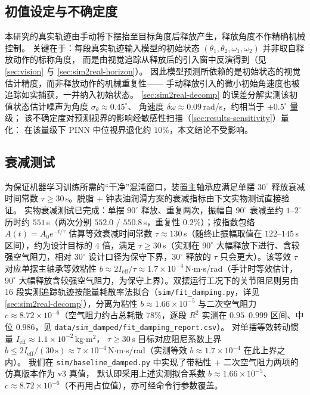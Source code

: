 \documentclass[a4paper,12pt]{ctexart}   %
\newcommand{\thetaone}{\theta_1}
\newcommand{\thetatwo}{\theta_2}
\renewcommand{\emph}[1]{#1}
\begin{document}
\subsection{初值设定与不确定度}
本研究的真实轨迹由手动将下摆抬至目标角度后释放产生，释放角度不作精确机械控制。
关键在于：每段真实轨迹输入模型的初始状态 $(\thetaone, \thetatwo, \omega_1, \omega_2)$ 并非取自释放动作的标称角度，
而是由视觉追踪从释放后的引入窗中反演得到（见 \cref{sec:vision} 与 \cref{sec:sim2real-horizon}）。
因此模型预测所依赖的是\emph{初始状态的视觉估计精度}，而非释放动作的机械重复性——
手动释放引入的微小初始角速度也被追踪如实捕获，一并纳入初始状态。
\cref{sec:sim2real-decomp} 的误差分解实测该初值状态估计噪声为角度 $\sigma_\theta \approx 0.45^\circ$、
角速度 $\delta\omega \approx 0.09$\,rad/s，约相当于 $\pm 0.5^\circ$ 量级；
该不确定度对预测视界的影响经敏感性扫描（\cref{sec:results-sensitivity}）量化：
在该量级下 PINN 中位视界退化约 $10\%$，本文结论不受影响。

\subsection{衰减测试}
为保证机器学习训练所需的“干净”混沌窗口，装置主轴承应满足单摆 $30^\circ$ 释放衰减时间常数
$\tau \geq 30$\,s。脱脂 + 钟表油润滑方案的衰减指标由下文实物测试直接验证。
实物衰减测试已完成：单摆 $90^\circ$ 释放、重复两次，振幅自 $90^\circ$ 衰减至约 $1\text{--}2^\circ$ 历时约 $551$\,s（两次分别 $552.0$ / $550.8$\,s，重复性 $0.2\%$）；按指数包络 $A(t) = A_0 e^{-t/\tau}$ 估算等效衰减时间常数 $\tau \approx 130$\,s（随终止振幅取值在 $122\text{--}145$\,s 区间），约为设计目标的 $4$ 倍，满足 $\tau \geq 30$\,s（实测在 $90^\circ$ 大幅释放下进行、含较强空气阻力，相对 $30^\circ$ 设计口径为保守下界，$30^\circ$ 释放的 $\tau$ 只会更大）。该等效 $\tau$ 对应单摆主轴承等效粘性 $b \approx 2 I_{\mathrm{eff}} / \tau \approx 1.7 \times 10^{-4}$\,N$\cdot$m$\cdot$s/rad（手计时等效估计，$90^\circ$ 大幅释放含较强空气阻力，为保守上界）。\emph{双摆运行工况}下的关节阻尼则另由 16 段实测追踪轨迹按能量耗散率法拟合（\texttt{sim/fit\_damping.py}，详见 \cref{sec:sim2real-decomp}），分离为粘性 $b \approx 1.66 \times 10^{-5}$ 与二次空气阻力 $c \approx 8.72 \times 10^{-6}$（空气阻力约占总耗散 $78\%$，逐段 $R^2$ 实测在 $0.95\text{–}0.999$ 区间、中位 $0.986$，见 \texttt{data/sim\_damped/fit\_damping\_report.csv}）。
对单摆等效转动惯量 $I_{\mathrm{eff}} \approx 1.1 \times 10^{-2}$\,kg$\cdot$m$^2$，
$\tau \geq 30$\,s 目标对应阻尼系数上界 $b \leq 2 I_{\mathrm{eff}} / (30\,\text{s}) \approx 7 \times 10^{-4}$\,N$\cdot$m$\cdot$s/rad（实测等效 $b \approx 1.7 \times 10^{-4}$ 在此上界之内）。
我们在 \texttt{sim/baseline\_damped.py} 中实现了带粘性 + 二次空气阻力两项的仿真版本作为 \emph{v3 真值}，
默认即采用上述实测拟合系数 $b \approx 1.66 \times 10^{-5}$、$c \approx 8.72 \times 10^{-6}$（不再用占位值），亦可经命令行参数覆盖。
\end{document}
